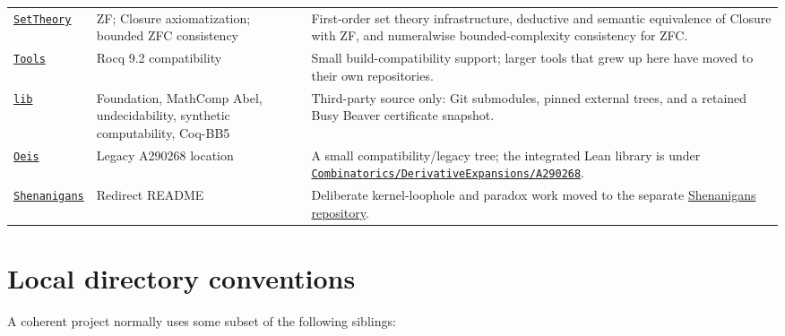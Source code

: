 \documentclass[
  10pt,
  a4paper,
  twoside,
  open=any,
  parskip=half,
  headings=big
]{scrreprt}
\newcommand{\CommitFull}{56a402bf82a9aab119fcbe3e96b991d387b221c5}
\newcommand{\RepoWeb}{https://github.com/VladimirReshetnikov/ProveIt}
\newcommand{\RepoTreeBase}{\RepoWeb/tree/\CommitFull}
\newcommand{\RepoDir}[1]{\href{\RepoTreeBase/#1}{\nolinkurl{#1}}}
\begin{document}
\begin{longtable}{@{}L{31mm}L{45mm}L{79mm}@{}}
\RepoDir{SetTheory} & ZF; Closure axiomatization; bounded ZFC consistency & First-order set theory infrastructure, deductive and semantic equivalence of Closure with ZF, and numeralwise bounded-complexity consistency for ZFC. \\
\RepoDir{Tools} & Rocq 9.2 compatibility & Small build-compatibility support; larger tools that grew up here have moved to their own repositories. \\
\RepoDir{lib} & Foundation, MathComp Abel, undecidability, synthetic computability, Coq-BB5 & Third-party source only: Git submodules, pinned external trees, and a retained Busy Beaver certificate snapshot. \\
\RepoDir{Oeis} & Legacy A290268 location & A small compatibility/legacy tree; the integrated Lean library is under \RepoDir{Combinatorics/DerivativeExpansions/A290268}. \\
\RepoDir{Shenanigans} & Redirect README & Deliberate kernel-loophole and paradox work moved to the separate \href{https://github.com/VladimirReshetnikov/Shenanigans}{Shenanigans repository}. \\
\end{longtable}

\section{Local directory conventions}

A coherent project normally uses some subset of the following siblings:

\begin{center}
\end{center}
\end{document}
